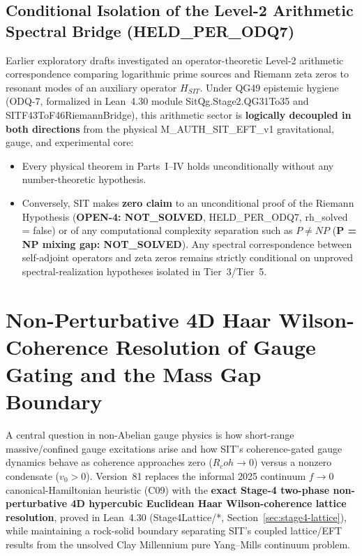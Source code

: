 \documentclass[american,11pt,letterpaper]{article}
\newcommand{\Rcoh}{R_{\mathrm{coh}}}
\def\mathrm#1{#1}%
\def\texttt#1{#1}%
\def\Rcoh{R_coh}%
\begin{document}
\subsection{Conditional Isolation of the Level-2 Arithmetic Spectral Bridge (\texttt{HELD\_PER\_ODQ7})}

Earlier exploratory drafts investigated an operator-theoretic Level-2 arithmetic correspondence comparing logarithmic prime sources and Riemann zeta zeros to resonant modes of an auxiliary operator $H_{\mathrm{SIT}}$. Under \texttt{QG49} epistemic hygiene (\texttt{ODQ-7}, formalized in Lean~4.30 module \texttt{SitQg.Stage2.QG31To35} and \texttt{SITF43\allowbreak{}To\allowbreak{}F46\allowbreak{}Riemann\allowbreak{}Bridge}), this arithmetic sector is \textbf{logically decoupled in both directions} from the physical \texttt{M\_AUTH\_SIT\_EFT\_v1} gravitational, gauge, and experimental core:
\begin{itemize}
  \item Every physical theorem in Parts~I--IV holds unconditionally without any number-theoretic hypothesis.
  \item Conversely, SIT makes \textbf{zero claim} to an unconditional proof of the Riemann Hypothesis (\textbf{\texttt{OPEN-4: NOT\_SOLVED}}, \texttt{HELD\_PER\_ODQ7}, \texttt{rh\_solved = false}) or of any computational complexity separation such as $P \ne NP$ (\textbf{\texttt{P = NP mixing gap: NOT\_\allowbreak{}SOLVED}}). Any spectral correspondence between self-adjoint operators and zeta zeros remains strictly conditional on unproved spectral-realization hypotheses isolated in Tier~3/Tier~5.
\end{itemize}


\section{Non-Perturbative 4D Haar Wilson-Coherence Resolution of Gauge Gating and the Mass Gap Boundary}
\label{sec:mass-gap}

A central question in non-Abelian gauge physics is how short-range massive/confined gauge excitations arise and how SIT's coherence-gated gauge dynamics behave as coherence approaches zero ($\Rcoh \to 0$) versus a nonzero condensate ($v_0 > 0$). Version~81 replaces the informal 2025 continuum $f \to 0$ canonical-Hamiltonian heuristic (\texttt{C09}) with the \textbf{exact Stage-4 two-phase non-perturbative 4D hypercubic Euclidean Haar Wilson-coherence lattice resolution}, proved in Lean~4.30 (\texttt{Stage4Lattice/*}, Section~\ref{sec:stage4-lattice}), while maintaining a rock-solid boundary separating SIT's coupled lattice/EFT results from the unsolved Clay Millennium pure Yang--Mills continuum problem.
\end{document}
